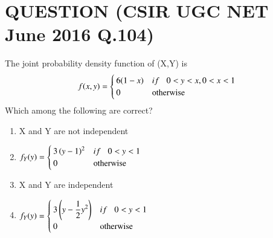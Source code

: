 \documentclass[journal,12pt,twocolumn]{IEEEtran}
\begin{document}
\section*{QUESTION (CSIR UGC NET June 2016 Q.104)}
The joint probability density function of (X,Y) is
\begin{equation}
    f(x,y) =
    \begin{cases}
        6(1-x) & if \hspace{0.3cm}0<y<x ,0<x<1\label{0.0.1} \\
        0      & \text{otherwise}
    \end{cases}
\end{equation}
Which among the following are correct?
\begin{enumerate}\itemsep0.3cm
    \item X and Y are not independent
    \item
          $ f_Y(y) =
              \begin{cases}
                  3\left(y-1\right)^{2} & if \hspace{0.3cm}0<y<1 \\
                  0               & \text{otherwise}
              \end{cases}$
    \item X and Y are independent
    \item $ f_Y(y) =
              \begin{cases}
                  3\left(\displaystyle{y-\frac{1}{2}{y}^2}\right) & if \hspace{0.3cm}0<y<1 \\
                  0                                         & \text{otherwise}
              \end{cases}$
\end{enumerate}
\end{document}
